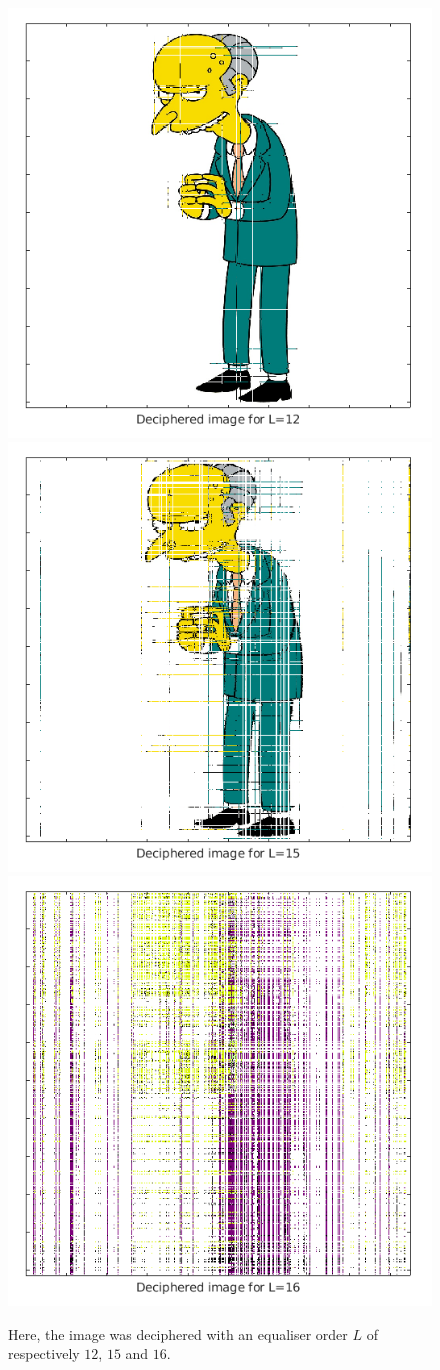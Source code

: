 \documentclass[twocolumn, 12pt]{IEEEtran}
\begin{document}
\begin{figure}[h]
   \begin{center}
      \includegraphics[width=.33\linewidth]{l12.png} \nolinebreak 
      \includegraphics[width=.33\linewidth]{l15.png} \nolinebreak 
      \includegraphics[width=.33\linewidth]{l16.png}
   \end{center}
\vspace{-0.6cm}
\caption{Here, the image was deciphered with an equaliser order $L$ of respectively $12$, $15$ and $16$.}
\label{fig:f1}
\end{figure}
\end{document}
